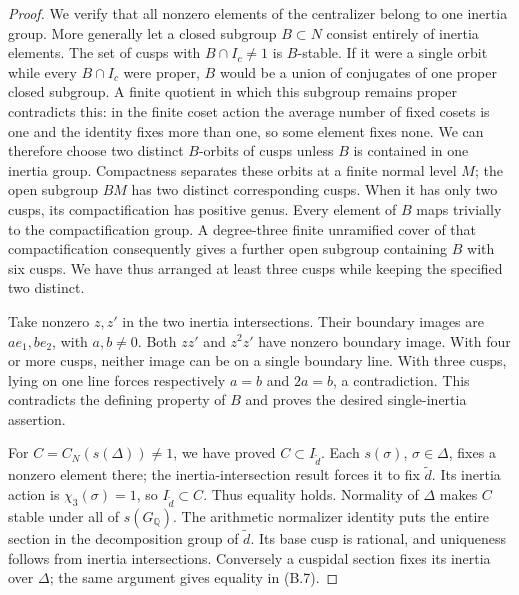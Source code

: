 \begin{proof}
We verify that all nonzero elements of the centralizer
belong to one inertia group.  More generally let a closed
subgroup $B\subset N$ consist entirely of inertia elements.
The set of cusps with $B\cap I_c\ne1$ is $B$-stable.  If
it were a single orbit while every $B\cap I_c$ were proper,
$B$ would be a union of conjugates of one proper closed
subgroup.  A finite quotient in which this subgroup remains
proper contradicts this: in the finite coset action the
average number of fixed cosets is one and the identity
fixes more than one, so some element fixes none.
We can therefore choose two distinct $B$-orbits of cusps
unless $B$ is contained in one inertia group.  Compactness
separates these orbits at a finite normal level $M$; the
open subgroup $BM$ has two distinct corresponding cusps.
When it has only two cusps, its compactification has
positive genus.  Every element of $B$ maps trivially to
the compactification group.  A degree-three finite
unramified cover of that compactification consequently
gives a further open subgroup containing $B$ with six
cusps.  We have thus arranged at least three cusps while
keeping the specified two distinct.

Take nonzero $z,z'$ in the two inertia intersections.
Their boundary images are $ae_1,be_2$, with $a,b\ne0$.
Both $zz'$ and $z^2z'$ have nonzero boundary image.
With four or more cusps, neither image can be on a
single boundary line.  With three cusps, lying on one
line forces respectively $a=b$ and $2a=b$, a contradiction.
This contradicts the defining property of $B$ and proves
the desired single-inertia assertion.

For $C=C_N(s(\Delta))\ne1$, we have proved
$C\subset I_{\widetilde d}$.  Each $s(\sigma)$,
$\sigma\in\Delta$, fixes a nonzero element there;
the inertia-intersection result forces it to fix
$\widetilde d$.  Its inertia action is $\chi_3(\sigma)=1$,
so $I_{\widetilde d}\subset C$.  Thus equality holds.
Normality of $\Delta$ makes $C$ stable under all of
$s(G_{\mathbb Q})$.  The arithmetic normalizer identity
puts the entire section in the decomposition group of
$\widetilde d$.  Its base cusp is rational, and uniqueness
follows from inertia intersections.  Conversely a
cuspidal section fixes its inertia over $\Delta$;
the same argument gives equality in (B.7).
\end{proof}


